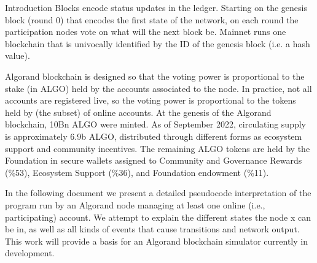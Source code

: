 \documentclass[10pt,a4paper]{article}
\begin{document}
\begin{section}{Introduction}
Blocks encode status updates in the ledger. Starting on the genesis
block (round 0) that encodes the first state of the network, 
on each round the participation nodes vote on what will the next
block be. 
Mainnet runs one blockchain that is univocally identified by the ID of
the genesis block (i.e. a hash value).

Algorand blockchain is designed so that the voting power is proportional
to the stake (in {\sf ALGO}) held by the accounts associated to the node.
In practice, not all accounts are registered live, so the voting power
is proportional to the tokens held by (the subset) of online accounts.
At the genesis of the Algorand blockchain, 10Bn {\sf ALGO} were minted. 
As of September 2022, circulating supply is approximately 6.9b {\sf ALGO}, 
distributed through different forms as ecosystem support and community
incentives.
The remaining {\sf ALGO} tokens are held by the Foundation in secure wallets 
assigned to 
Community and Governance Rewards (\%53), 
Ecosystem Support (\%36), and 
Foundation endowment (\%11).

In the following document we present a detailed pseudocode interpretation 
of the program run by an Algorand node managing at least one online (i.e., 
participating) account. We attempt to explain the different states the node x
can be in, as well as all kinds of events that cause transitions and network 
output. This work will provide a basis for an Algorand blockchain simulator 
currently in development.

\end{section}
\end{document}
